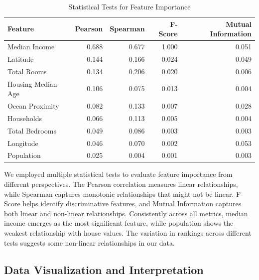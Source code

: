 \documentclass[a4paper, 11pt]{article}
\begin{document}
\begin{table}[h!]
    \centering
    \caption{Statistical Tests for Feature Importance}
    \begin{tabular}{lrrrr}
        \toprule
        \textbf{Feature} & \textbf{Pearson} & \textbf{Spearman} & \textbf{F-Score} & \textbf{Mutual Information} \\
        \midrule
        Median Income & 0.688 & 0.677 & 1.000 & 0.051 \\
        Latitude & 0.144 & 0.166 & 0.024 & 0.049 \\
        Total Rooms & 0.134 & 0.206 & 0.020 & 0.006 \\
        Housing Median Age & 0.106 & 0.075 & 0.013 & 0.004 \\
        Ocean Proximity & 0.082 & 0.133 & 0.007 & 0.028 \\
        Households & 0.066 & 0.113 & 0.005 & 0.004 \\
        Total Bedrooms & 0.049 & 0.086 & 0.003 & 0.003 \\
        Longitude & 0.046 & 0.070 & 0.002 & 0.053 \\
        Population & 0.025 & 0.004 & 0.001 & 0.003 \\
        \bottomrule
    \end{tabular}
\end{table}

We employed multiple statistical tests to evaluate feature importance from different perspectives. The Pearson correlation measures linear relationships, while Spearman captures monotonic relationships that might not be linear. F-Score helps identify discriminative features, and Mutual Information captures both linear and non-linear relationships. Consistently across all metrics, median income emerges as the most significant feature, while population shows the weakest relationship with house values. The variation in rankings across different tests suggests some non-linear relationships in our data.

\subsection{Data Visualization and Interpretation}
\end{document}
